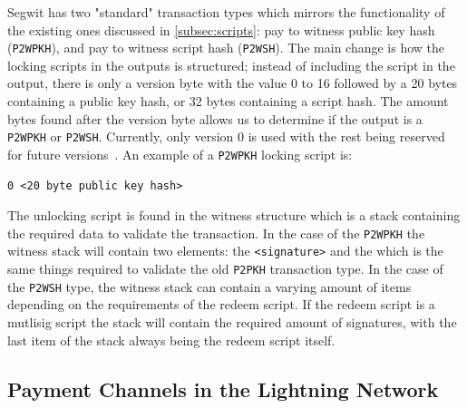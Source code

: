Segwit has two "standard" transaction types which mirrors the functionality of the existing ones discussed in \cref{subsec:scripts}: pay to witness public key hash ({\tt P2WPKH}), and pay to witness script hash ({\tt P2WSH}). The main change is how the locking scripts in the outputs is structured; instead of including the script in the output, there is only a version byte with the value 0 to 16 followed by a 20 bytes containing a public key hash, or 32 bytes containing a script hash. The amount bytes found after the version byte allows us to determine if the output is a {\tt P2WPKH} or {\tt P2WSH}. Currently, only version 0 is used with the rest being reserved for future versions~\cite{BIP141}. An example of a {\tt P2WPKH} locking script is:

\begin{verbatim}
0 <20 byte public key hash>
\end{verbatim}

The unlocking script is found in the witness structure which is a stack containing the required data to validate the transaction.
In the case of the {\tt P2WPKH} the witness stack will contain two elements: the {\tt <signature>} and the {\tt <public key>} which is the same things required to validate the old {\tt P2PKH} transaction type. In the case of the {\tt P2WSH} type, the witness stack can contain a varying amount of items depending on the requirements of the redeem script. If the redeem script is a mutlisig script the stack will contain the required amount of signatures, with the last item of the stack always being the redeem script itself.

\subsection{Payment Channels in the Lightning Network} 
\label{subsec:pcln}

